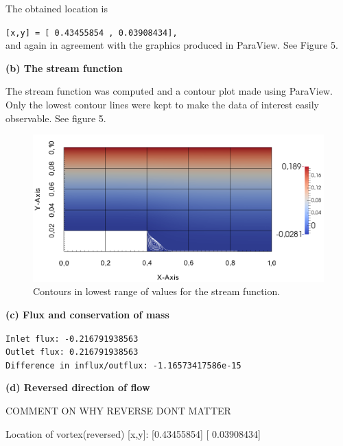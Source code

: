 \documentclass[11pt,a4paper,english]{article}
\numberwithin{equation}{section}
\begin{document}
The obtained location is 

\texttt{[x,y] =  [ 0.43455854 , 0.03908434],} \\

and again in agreement with the graphics produced in ParaView. See Figure 5. 


\textbf{(b) The stream function}

The stream function was computed and a contour plot made using ParaView. Only the lowest contour lines were kept to make the data of interest easily observable. See figure 5. 

\vspace{1.5cm}
\begin{figure}[h!]
\begin{center}
  \includegraphics[scale=0.35]{psi_step.png}
  \end{center}
  \caption{Contours in lowest range of values for the stream function.}
\end{figure}

\textbf{(c) Flux and conservation of mass}

\noindent
\texttt{Inlet flux:  -0.216791938563} \\
\texttt{Outlet flux:  0.216791938563} \\
\texttt{Difference in influx/outflux: -1.16573417586e-15}


\textbf{(d) Reversed direction of flow}

COMMENT ON WHY REVERSE DONT MATTER

Location of vortex(reversed) [x,y]:  [0.43455854] [ 0.03908434]
\end{document}
